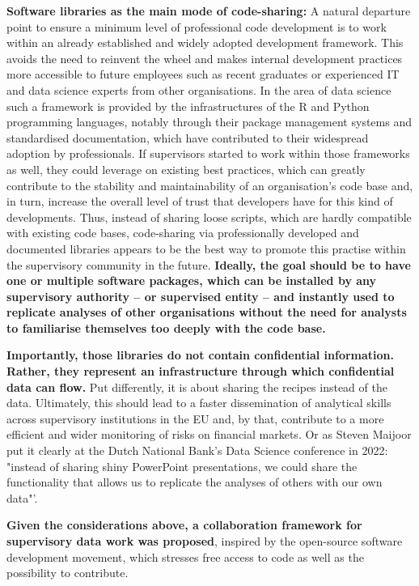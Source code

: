 \documentclass[a4paper, 11pt]{report}
\begin{document}
\textbf{Software libraries as the main mode of code-sharing:} A natural departure point to ensure a minimum level of professional code development is to work within an already established and widely adopted development framework. This avoids the need to reinvent the wheel and makes internal development practices more accessible to future employees such as recent graduates or experienced IT and data science experts from other organisations. In the area of data science such a framework is provided by the infrastructures of the R and Python programming languages, notably through their package management systems and standardised documentation, which have contributed to their widespread adoption by professionals. If supervisors started to work within those frameworks as well, they could leverage on existing best practices, which can greatly contribute to the stability and maintainability of an organisation's code base and, in turn, increase the overall level of trust that developers have for this kind of developments. Thus, instead of sharing loose scripts, which are hardly compatible with existing code bases, code-sharing via professionally developed and documented libraries appears to be the best way to promote this practise within the supervisory community in the future. \textbf{Ideally, the goal should be to have one or multiple software packages, which can be installed by any supervisory authority -- or supervised entity -- and instantly used to replicate analyses of other organisations without the need for analysts to familiarise themselves too deeply with the code base.}

\textbf{Importantly, those libraries do not contain confidential information. Rather, they represent an infrastructure through which confidential data can flow.} Put differently, it is about sharing the recipes instead of the data. Ultimately, this should lead to a faster dissemination of analytical skills across supervisory institutions in the EU and, by that, contribute to a more efficient and wider monitoring of risks on financial markets. Or as Steven Maijoor put it clearly at the Dutch National Bank's Data Science conference in 2022: "instead of sharing shiny PowerPoint presentations, we could share the functionality that allows us to replicate the analyses of others with our own data"'.

\textbf{Given the considerations above, a collaboration framework for supervisory data work was proposed}, inspired by the open-source software development movement, which stresses free access to code as well as the possibility to contribute.
\end{document}
